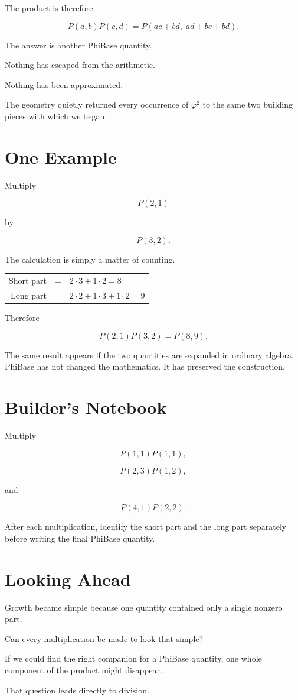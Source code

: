 The product is therefore

\[
P(a,b)P(c,d)
=
P(ac+bd,\;ad+bc+bd).
\]

The answer is another PhiBase quantity.

Nothing has escaped from the arithmetic.

Nothing has been approximated.

The geometry quietly returned every occurrence of \(\varphi^{2}\) to the same two building pieces with which we began.

\section*{One Example}

Multiply

\[
P(2,1)
\]

by

\[
P(3,2).
\]

The calculation is simply a matter of counting.

\begin{center}
\begin{tabular}{rcl}
Short part &=& \(2\cdot3+1\cdot2=8\)\\[0.6ex]
Long part  &=& \(2\cdot2+1\cdot3+1\cdot2=9\)
\end{tabular}
\end{center}

Therefore

\[
P(2,1)P(3,2)=P(8,9).
\]

The same result appears if the two quantities are expanded in ordinary algebra. PhiBase has not changed the mathematics. It has preserved the construction.

\section*{Builder's Notebook}

Multiply

\[
P(1,1)P(1,1),
\]

\[
P(2,3)P(1,2),
\]

and

\[
P(4,1)P(2,2).
\]

After each multiplication, identify the short part and the long part separately before writing the final PhiBase quantity.

\section*{Looking Ahead}

Growth became simple because one quantity contained only a single nonzero part.

Can every multiplication be made to look that simple?

If we could find the right companion for a PhiBase quantity, one whole component of the product might disappear.

That question leads directly to division.
